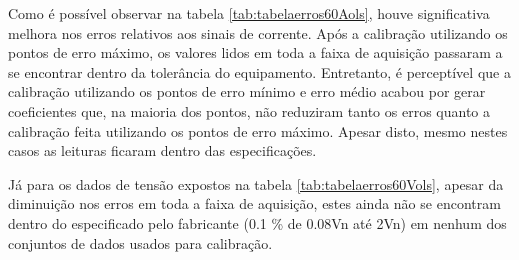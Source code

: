\begin{table}[htb]
\end{table}

Como é possível observar na tabela \ref{tab:tabelaerros60Aols}, houve significativa melhora nos erros relativos aos sinais de corrente. Após a calibração utilizando os pontos de erro máximo, os valores lidos em toda a faixa de aquisição passaram a se encontrar dentro da tolerância do equipamento. Entretanto, é perceptível que a calibração utilizando os pontos de erro mínimo e erro médio acabou por gerar coeficientes que, na maioria dos pontos, não reduziram tanto os erros quanto a calibração feita utilizando os pontos de erro máximo. Apesar disto, mesmo nestes casos as leituras ficaram dentro das especificações.

Já para os dados de tensão expostos na tabela \ref{tab:tabelaerros60Vols}, apesar da diminuição nos erros em toda a faixa de aquisição, estes ainda não se encontram dentro do especificado pelo fabricante (0.1 \% de 0.08Vn até 2Vn) em nenhum dos conjuntos de dados usados para calibração.

